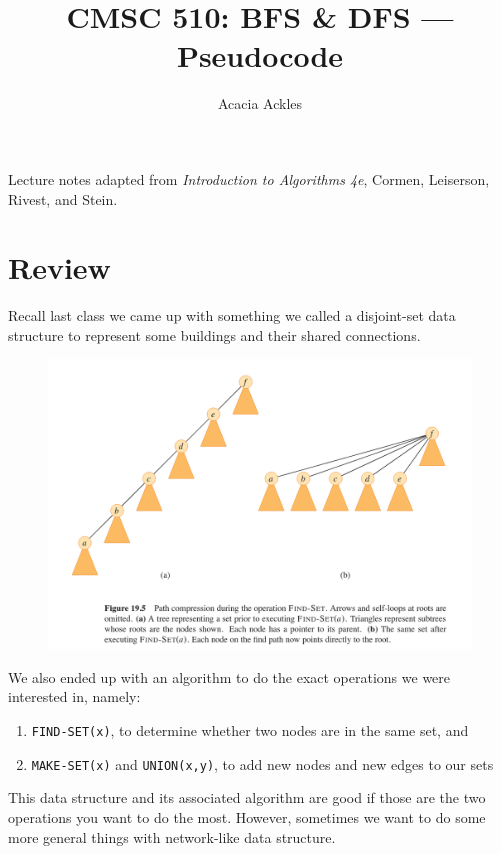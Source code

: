\documentclass[12pt]{article}
\title{CMSC 510: BFS \& DFS --- Pseudocode}
\author{Acacia Ackles}
\begin{document}
    
\maketitle

Lecture notes adapted from \textit{Introduction to Algorithms 4e}, Cormen, Leiserson, Rivest, and Stein.

\section*{Review}

Recall last class we came up with something we called a disjoint-set data structure to represent some buildings and their shared connections. 

\begin{figure}[h]
    \includegraphics[width=\textwidth]{disjoint-set.png}
\end{figure}

We also ended up with an algorithm to do the exact operations we were interested in, namely:

\begin{enumerate}
    \item  \texttt{FIND-SET(x)}, to determine whether two nodes are in the same set, and
    \item \texttt{MAKE-SET(x)} and \texttt{UNION(x,y)}, to add new nodes and new edges to our sets
\end{enumerate}

This data structure and its associated algorithm are good if those are the two operations you want to do the most. However, sometimes we want to do some more general things with network-like data structure.
\end{document}
